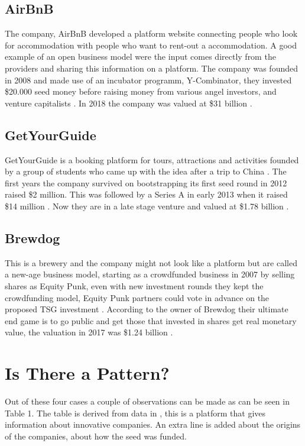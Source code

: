 \documentclass[a4paper, 11pt]{article}
\begin{document}
\subsection{AirBnB}
The company, AirBnB developed a platform website connecting people who look for accommodation with people who want to rent-out a accommodation. A good example of an open business model were the input comes directly from the providers and sharing this information on a platform. The company was founded in 2008 and made use of an incubator programm, Y-Combinator, they invested \$20.000 seed money before raising money from various angel investors, and venture capitalists \citep{mazzarini}. In 2018 the company was valued at \$31 billion \citep{mazzarini}.

\subsection{GetYourGuide}
GetYourGuide is a booking platform for tours, attractions and activities founded by a group of students who came up with the idea after a trip to China \citep{getyourguide}. The first years the company survived on bootstrapping its first seed round in 2012 raised \$2 million. This was followed by a Series A in early 2013 when it raised \$14 million \citep{webintravel}. Now they are in a late stage venture and valued at \$1.78 billion \citep{techcrunh}. 

\subsection{Brewdog}
This is a brewery and the company might not look like a platform but are called a new-age business model, starting as a crowdfunded business in 2007 by selling shares as Equity Punk, even with new investment rounds they kept the crowdfunding model, Equity Punk partners could vote in advance on the proposed TSG investment \citep{danziger}. According to the owner of Brewdog their ultimate end game is to go public and get those that invested in shares get real monetary value, the valuation in 2017 was \$1.24 billion \citep{danziger}.

\section{Is There a Pattern?}

Out of these four cases a couple of observations can be made as can be seen in Table 1. The table is derived from data in \cite{crunch}, this is a platform that gives information about innovative companies. An extra line is added about the origins of the companies, about how the seed was funded. 
\end{document}
